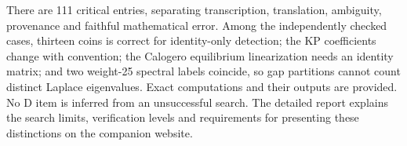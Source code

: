 There are 111 critical entries, separating transcription,
translation, ambiguity, provenance and faithful mathematical error.
Among the independently checked cases, thirteen coins is correct for
identity-only detection; the KP coefficients change with convention;
the Calogero equilibrium linearization needs an identity matrix; and two
weight-25 spectral labels coincide, so gap partitions cannot count
distinct Laplace eigenvalues. Exact computations and their outputs are
provided. No D item is inferred from an unsuccessful search. The detailed
report explains the search limits, verification levels and requirements
for presenting these distinctions on the companion website.
\nocite{mccme2026gelfand}
